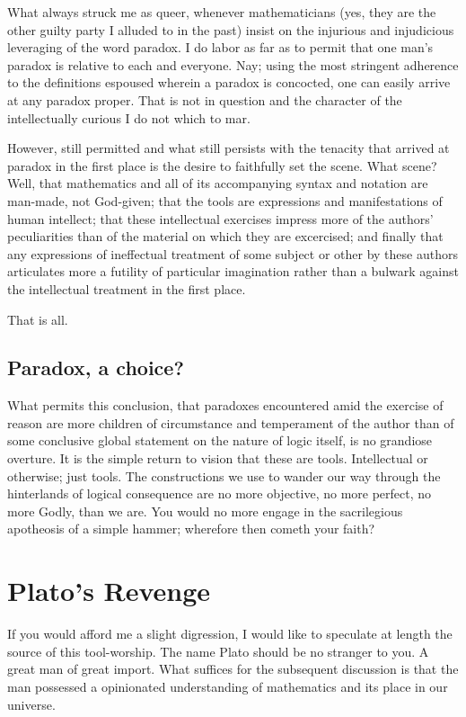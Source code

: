 \documentclass{article}
\begin{document}
	What always struck me as queer, whenever mathematicians (yes, they are the other guilty party I alluded to in the past) insist on the injurious and injudicious leveraging of the word paradox. I do labor as far as to permit that one man's paradox is relative to each and everyone. Nay; using the most stringent adherence to the definitions espoused wherein a paradox is concocted, one can easily arrive at any paradox proper. That is not in question and the character of the intellectually curious I do not which to mar.
	
	However, still permitted and what still persists with the tenacity that arrived at paradox in the first place is the desire to faithfully set the scene. What scene? Well, that mathematics and all of its accompanying syntax and notation are man-made, not God-given; that the tools are expressions and manifestations of human intellect; that these intellectual exercises impress more of the authors' peculiarities than of the material on which they are excercised; and finally that any expressions of ineffectual treatment of some subject or other by these authors articulates more a futility of particular imagination rather than a bulwark against the intellectual treatment in the first place.
	
	That is all.
	
	\subsection{Paradox, a choice?}
	
	What permits this conclusion, that paradoxes encountered amid the exercise of reason are more children of circumstance and temperament of the author than of some conclusive global statement on the nature of logic itself, is no grandiose overture. It is the simple return to vision that these are tools. Intellectual or otherwise; just tools. The constructions we use to wander our way through the hinterlands of logical consequence are no more objective, no more perfect, no more Godly, than we are. You would no more engage in the sacrilegious apotheosis of a simple hammer; wherefore then cometh your faith?
	
	\section{Plato's Revenge}
	
	If you would afford me a slight digression, I would like to speculate at length the source of this tool-worship. The name Plato should be no stranger to you. A great man of great import. What suffices for the subsequent discussion is that the man possessed a opinionated understanding of mathematics and its place in our universe.
	
\end{document}
